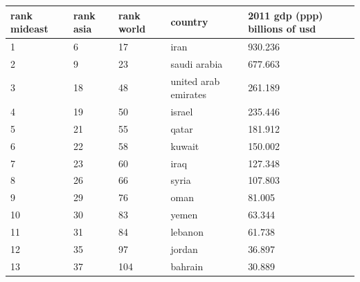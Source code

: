 \documentclass{article}
\begin{document}
\begin{tabular}{lllll}
\toprule
rank mideast & rank asia & rank world & country & 2011 gdp (ppp) billions of usd \\
\midrule
1 & 6 & 17 & iran & 930.236 \\
2 & 9 & 23 & saudi arabia & 677.663 \\
3 & 18 & 48 & united arab emirates & 261.189 \\
4 & 19 & 50 & israel & 235.446 \\
5 & 21 & 55 & qatar & 181.912 \\
6 & 22 & 58 & kuwait & 150.002 \\
7 & 23 & 60 & iraq & 127.348 \\
8 & 26 & 66 & syria & 107.803 \\
9 & 29 & 76 & oman & 81.005 \\
10 & 30 & 83 & yemen & 63.344 \\
11 & 31 & 84 & lebanon & 61.738 \\
12 & 35 & 97 & jordan & 36.897 \\
13 & 37 & 104 & bahrain & 30.889 \\
\bottomrule
\end{tabular}
\end{document}
